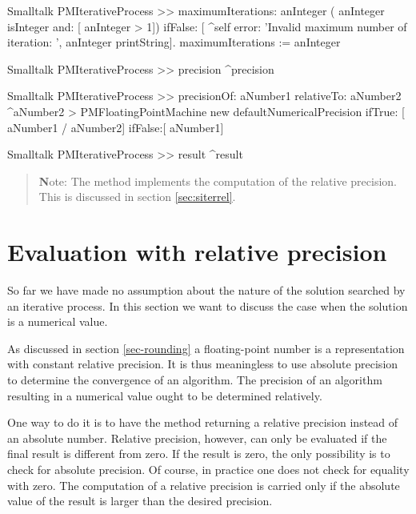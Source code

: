 \begin{displaycode}{Smalltalk}
PMIterativeProcess >> maximumIterations: anInteger
    ( anInteger isInteger and: [ anInteger > 1])
        ifFalse: [ ^self error: 'Invalid maximum number of iteration: 
                                            ', anInteger printString].
    maximumIterations := anInteger
\end{displaycode}

\begin{displaycode}{Smalltalk}
PMIterativeProcess >> precision
    ^precision
\end{displaycode}

\begin{displaycode}{Smalltalk}
PMIterativeProcess >> precisionOf: aNumber1 relativeTo: aNumber2
    ^aNumber2 > PMFloatingPointMachine new defaultNumericalPrecision
        ifTrue: [ aNumber1 / aNumber2]
        ifFalse:[ aNumber1]
\end{displaycode}

\begin{displaycode}{Smalltalk}
PMIterativeProcess >> result
   ^result
\end{displaycode}

\begin{quote}
{\textbf Note:} The method  implements
the computation of the relative precision. This is discussed in
section \ref{sec:siterrel}.
\end{quote}


\section{Evaluation with relative precision}
\label{sec:iterrel}
So far we have made no
assumption about the nature of the solution searched by an
iterative process. In this section we want to discuss the case
when the solution is a numerical value.

As discussed in section \ref{sec-rounding} a floating-point number
is a representation with constant relative precision. It is thus
meaningless to use absolute precision to determine the convergence
of an algorithm. The precision of an algorithm resulting in a
numerical value ought to be determined relatively.

One way to do it is to have the method 
returning a relative precision instead of an absolute number.
Relative precision, however, can only be evaluated if the final
result is different from zero. If the result is zero, the only
possibility is to check for absolute precision. Of course, in
practice one does not check for equality with zero. The
computation of a relative precision is carried only if the
absolute value of the result is larger than the desired precision.

